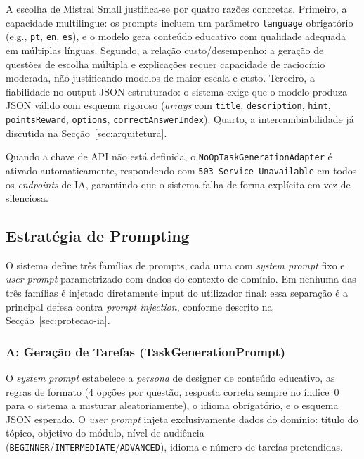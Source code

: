 A escolha de Mistral Small justifica-se por quatro razões concretas.
Primeiro, a capacidade multilingue: os prompts incluem um parâmetro \texttt{language} obrigatório (e.g., \texttt{pt}, \texttt{en}, \texttt{es}), e o modelo gera conteúdo educativo com qualidade adequada em múltiplas línguas.
Segundo, a relação custo/desempenho: a geração de questões de escolha múltipla e explicações requer capacidade de raciocínio moderada, não justificando modelos de maior escala e custo.
Terceiro, a fiabilidade no output JSON estruturado: o sistema exige que o modelo produza JSON válido com esquema rigoroso (\textit{arrays} com \texttt{title}, \texttt{description}, \texttt{hint}, \texttt{pointsReward}, \texttt{options}, \texttt{correctAnswerIndex}).
Quarto, a intercambiabilidade já discutida na Secção~\ref{sec:arquitetura}.

Quando a chave de API não está definida, o \texttt{NoOpTaskGenerationAdapter} é ativado automaticamente, respondendo com \texttt{503 Service Unavailable} em todos os \textit{endpoints} de IA, garantindo que o sistema falha de forma explícita em vez de silenciosa.

\subsection{Estratégia de Prompting} \label{sec:prompting}

O sistema define três famílias de prompts, cada uma com \textit{system prompt} fixo e \textit{user prompt} parametrizado com dados do contexto de domínio.
Em nenhuma das três famílias é injetado diretamente input do utilizador final: essa separação é a principal defesa contra \textit{prompt injection}, conforme descrito na Secção~\ref{sec:protecao-ia}.

\subsubsection*{A: Geração de Tarefas (TaskGenerationPrompt)}

O \textit{system prompt} estabelece a \textit{persona} de designer de conteúdo educativo, as regras de formato (4 opções por questão, resposta correta sempre no índice~0 para o sistema a misturar aleatoriamente), o idioma obrigatório, e o esquema JSON esperado.
O \textit{user prompt} injeta exclusivamente dados do domínio: título do tópico, objetivo do módulo, nível de audiência (\texttt{BEGINNER}/\texttt{INTERMEDIATE}/\texttt{ADVANCED}), idioma e número de tarefas pretendidas.

